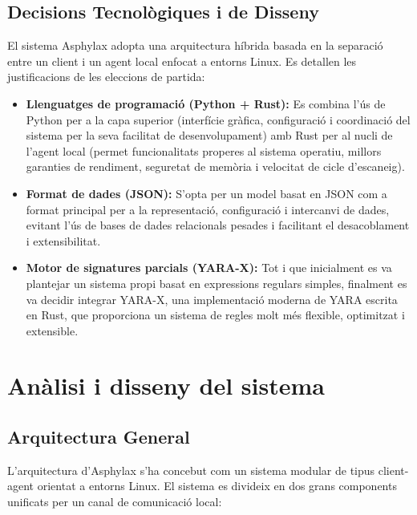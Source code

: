 \documentclass[12pt,a4paper]{report}
\begin{document}
\section{Decisions Tecnològiques i de Disseny}
El sistema Asphylax adopta una arquitectura híbrida basada en la separació entre un client i un agent local enfocat a entorns Linux. Es detallen les justificacions de les eleccions de partida:
\begin{itemize}
    \item \textbf{Llenguatges de programació (Python + Rust):} Es combina l'ús de Python per a la capa superior (interfície gràfica, configuració i coordinació del sistema per la seva facilitat de desenvolupament) amb Rust per al nucli de l'agent local (permet funcionalitats properes al sistema operatiu, millors garanties de rendiment, seguretat de memòria i velocitat de cicle d'escaneig).
    \item \textbf{Format de dades (JSON):} S'opta per un model basat en JSON com a format principal per a la representació, configuració i intercanvi de dades, evitant l'ús de bases de dades relacionals pesades i facilitant el desacoblament i extensibilitat.
    \item \textbf{Motor de signatures parcials (YARA-X):} Tot i que inicialment es va plantejar un sistema propi basat en expressions regulars simples, finalment es va decidir integrar YARA-X, una implementació moderna de YARA escrita en Rust, que proporciona un sistema de regles molt més flexible, optimitzat i extensible.
\end{itemize}


\chapter{Anàlisi i disseny del sistema}
\label{ch:analisidisseny}

\section{Arquitectura General}
L'arquitectura d'Asphylax s'ha concebut com un sistema modular de tipus client-agent orientat a entorns Linux. El sistema es divideix en dos grans components unificats per un canal de comunicació local:
\end{document}
